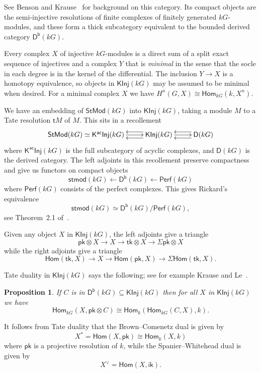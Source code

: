 \documentclass[12pt]{amsart}
\newcommand{\DD}{\mathsf{D}}%
\newcommand{\Db}{\DD^{\mathsf{b}}}%
\newcommand{\Hom}{\mathsf{Hom}}
\newcommand{\ik}{\mathsf{ik}}
\newcommand{\kG}{\kk G}
\newcommand{\kk}{k}
\newcommand{\KInj}{\mathsf{KInj}}
\newcommand{\KacInj}{\mathsf{K^{ac}Inj}}
\newcommand{\pk}{\mathsf{pk}}
\newcommand{\Perf}{\mathsf{Perf}}
\newcommand{\stmod}{\mathsf{stmod}}
\newcommand{\StMod}{\mathsf{StMod}}
\newcommand{\tk}{\mathsf{tk}}
\newcommand{\tM}{\mathsf{t}M}
\numberwithin{equation}{section}
\theoremstyle{plain}
\newtheorem{proposition}[equation]{Proposition}
\theoremstyle{definition}
\theoremstyle{remark}
\begin{document}
See Benson and Krause~\cite{Benson/Krause:2008a} for background on
this category. Its compact objects are the semi-injective resolutions 
of finite complexes of finitely generated $\kG$-modules, and these form
a thick subcategory equivalent to the bounded derived category
$\Db(\kG)$.

Every complex $X$ of injective $\kG$-modules is a direct sum of a split
exact sequence of injectives and a complex $Y$ that is \emph{minimal} in
the sense that the socle in each degree is in the kernel of the
differential. The inclusion $Y \to X$ is a homotopy equivalence,
so objects in $\KInj(\kG)$ may be assumed to be minimal when
desired. For a minimal complex $X$ we have $H^n(G,X)\cong
\Hom_{\kG}(\kk,X^n)$. 

We have an embedding of $\StMod(\kG)$ into $\KInj(\kG)$, taking
a module $M$ to a Tate resolution $\tM$ of $M$. This sits in a
recollement
\[ \xymatrix{\StMod(\kG)\simeq\KacInj(\kG)\ar[r] &
\KInj(\kG) \ar@<1ex>[l]\ar@<-1ex>[l]\ar[r] &
\DD(\kG)\ar@<1ex>[l]\ar@<-1ex>[l]} \]
where $\KacInj(\kG)$ is the full subcategory of acyclic complexes, 
and  $\DD(\kG)$ is the derived category. The left adjoints in this
recollement preserve compactness and give us functors on compact objects
\[ \stmod(\kG) \leftarrow \Db(\kG) \leftarrow \Perf(\kG) \]
where $\Perf(\kG)$ consists of the perfect complexes. This gives
Rickard's equivalence
\[ \stmod(\kG)\simeq\Db(\kG)/\Perf(\kG), \]
see Theorem~2.1 of~\cite{Rickard:1989a}.

Given any object $X$ in $\KInj(\kG)$, the left adjoints give a
triangle
\[ \pk \otimes X \to X \to \tk \otimes X \to \Sigma\pk\otimes X \]
while the right adjoints give a triangle
\[ \Hom(\tk,X) \to X \to \Hom(\pk,X) \to \Sigma\Hom(\tk,X). \]



Tate duality in $\KInj(\kG)$ says the following; see for example
Krause and Le~\cite{Krause/Le:2006a}.

\begin{proposition}\label{pr:Tate-KInj}
If $C$ is in $\Db(\kG)\subseteq\KInj(\kG)$ then for all $X$ in
$\KInj(\kG)$ we have
\[ \Hom_{\kG}(X,\pk\otimes C) \cong
  \Hom_\kk(\Hom_{\kG}(C,X),\kk). \]
\end{proposition}

It follows from Tate duality that 
the Brown--Comenetz dual is given by  
\[ X^*= \Hom(X,\pk) \cong \Hom_{\kk}(X,\kk) \] 
where $\pk$ is a projective resolution of $\kk$,
while the Spanier--Whitehead dual is given
by
\[ X^\vee = \Hom(X,\ik). \]
\end{document}
